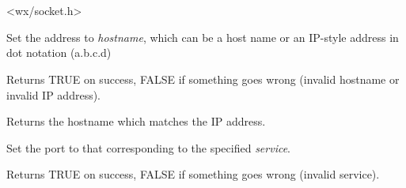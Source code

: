 \section{}\label{wxipv4address}




<wx/socket.h>



%
%



Set the address to {\it hostname}, which can be a host name
or an IP-style address in dot notation (a.b.c.d)


Returns TRUE on success, FALSE if something goes wrong
(invalid hostname or invalid IP address).

%
%



Returns the hostname which matches the IP address.

%
%



Set the port to that corresponding to the specified {\it service}.


Returns TRUE on success, FALSE if something goes wrong
(invalid service).

%
%



